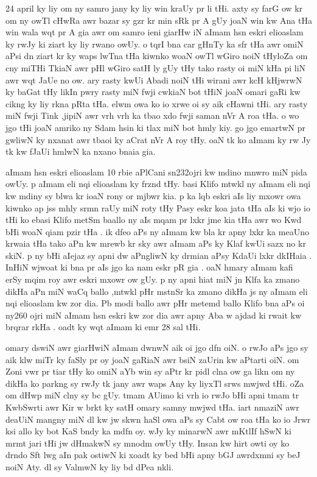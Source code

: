 \documentclass[a4paper]{article}
\begin{document}
24 april ky liy om ny samro jany ky liy win kraUy pr li tHi.
axty sy farG ow kr om ny owTl cHwRa awr bazar sy gzr kr min sRk pr  A gUy joaN win kw Ana tHa win wala wqt pr A gia awr om samro ieni giarHw iN aImam hsn eskri elioaslam ky rwJy ki ziart ky liy rwano owUy.
o tqrI  bna car gHnTy ka sfr tHa awr omiN aPsi dn ziart kr ky waps lwTna tHa kiwnko woaN owTl wGiro noiN tHyloZa om cny miTHi TkiaN awr pHl wGiro satH ly gUy tHy tako rasty oi miN kHa pi liN awr wqt JaUe no ow.
ary rasty kwUi Abadi noiN tHi wirani awr kcH kHjwrwN ky baGat  tHy likIn pwry rasty miN fwji cwkiaN bot tHiN joaN omari gaRi kw cikng ky liy rkna pRta tHa.
elwm owa ko io xrwe oi sy aik cHawni tHi.
ary rasty miN fwji Tink ,jipiN awr vrh vrh ka tbao xdo fwji saman nVr A roa tHa.
o wo jgo tHi joaN amriko ny Sdam hsin ki tlax miN bot hmly kiy.
go jgo emartwN pr gwliwN ky nxanat awr tbaoi ky aCrat nVr A roy tHy.
oaN tk ko aImam ky rw Jy tk kw fJaUi hmlwN ka nxano bnaia gia.

aImam hsn eskri elioaslam 10 rbie aPlCani sn232ojri kw mdino mnwro miN pida owUy.
p aImam eli nqi elioaslam ky frznd tHy.
basi Klifo mtwkl ny aImam eli nqi kw mdiny sy blwa kr ioaN rony or mjbwr kia.
p ka lqb eskri aIs liy mxowr owa kiwnko ap jss mhly srmn raUy miN roty tHy Pasy eskr koa jata tHa aIs ki wjo io tHi ko ebasi Klifo metSm baallo ny aIs mqam pr lxkr jme kia tHa awr wo Kwd bHi woaN qiam pzir tHa .
ik dfeo aPs ny aImam kw bla kr apny lxkr ka meaUno krwaia tHa tako aPn kw mrewb kr sky awr aImam aPs ky Klaf kwUi sazx no kr skiN.
p ny bHi aIejaz sy apni dw aPngliwN ky drmian aPsy KdaUi lxkr dkIHaia .
InHiN wjwoat ki bna pr aIs jgo ka nam eskr pR gia .
oaN hmary aImam kafi erSy mqim roy awr eskri mxowr ow gUy.
p ny apni hiat miN jn Klfa ka zmano dikHa  aPn miN waCq ballo ,mtwkl pHr mstnSr ka zmano dikHa js ny aImam eli nqi elioaslam kw zor dia.
Pb modi ballo awr pHr metemd ballo Klifo bna aPs oi ny260 ojri miN aImam hsn eskri kw zor dia awr apny Aba w ajdad ki rwait kw brqrar rkHa .
oadt ky wqt aImam ki emr 28 sal tHi.

omary dswiN awr giarHwiN aImam dwnwN aik oi jgo dfn oiN.
o rwJo aPs jgo sy aik klw miTr ky faSly pr oy joaN gaRiaN awr bsiN zaUrin kw aPtarti oiN.
om     Zoni vwr pr tiar  tHy ko omiN aYb win sy aPtr kr pidl clna ow ga likn om ny dikHa ko parkng sy rwJy tk jany awr waps Any ky liyxTl srws mwjwd tHi.
oZa om dHwp miN clny sy bc gUy.
tmam AUimo ki vrh io rwJo bHi apni tmam tr KwbSwrti  awr  Kir w brkt ky satH omary samny mwjwd tHa.
iart nmaziN awr deaUiN mangny  miN dl kw jw skwn  haSl owa aPs sy Cabt ow roa tHa ko io Jrwr ksi allo ky bot KaS bndy ka mdfn oy.
wJy ky minarwN awr mKtlIf hSwN ki mrmt jari tHi jw dHmakwN sy mnodm owUy tHy.
Insan kw hirt owti oy ko drndo Sft lwg aIn pak ostiwN ki xoadt ky bed bHi apny bGJ awrdxmni sy beJ noiN Aty.
dl sy ValmwN ky liy bd dPea nkli.
\end{document}
